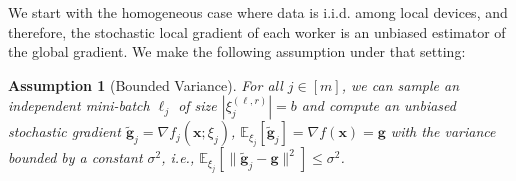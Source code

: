 \documentclass[sigconf, anonymous, review]{acmart}
\newtheorem{assumption}{Assumption}
\begin{document}
We start with the homogeneous case where data is i.i.d. among local devices, and therefore, the stochastic local gradient of each worker is an unbiased estimator of the global gradient.
We make the following assumption under that setting:
\begin{assumption}[Bounded Variance]\label{Assu:1.5}
For all $j\in [m]$, we can sample an independent mini-batch $\ell_j$ of size $|\xi_j^{(\ell,r)}| = b$ and compute an unbiased stochastic gradient  $\tilde{\mathbf{g}}_j = \nabla f_j(\boldsymbol{x}; \xi_j)$, $\mathbb{E}_{\xi_j}[\tilde{\mathbf{g}}_j] = \nabla f(\boldsymbol{x})=\mathbf{g}$ with the variance bounded by a constant $\sigma^2$, i.e., $\mathbb{E}_{\xi_j}\left[\|\tilde{\mathbf{g}}_j-\mathbf{g}\|^2\right]\leq \sigma^2$.
\end{assumption}
\end{document}
